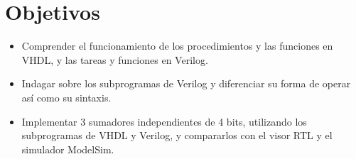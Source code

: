 \section{Objetivos \label{sec:obj}}


\begin{itemize} 
	\item Comprender el funcionamiento de los procedimientos y las funciones en VHDL, y  las tareas y funciones en Verilog.
	
	\item Indagar sobre los subprogramas de Verilog y diferenciar su forma de operar así como su sintaxis.
	
	\item Implementar 3 sumadores independientes de 4 bits, utilizando los subprogramas de VHDL y Verilog, y compararlos con el visor RTL y el simulador ModelSim.
\end{itemize}